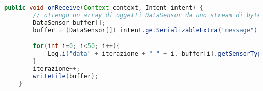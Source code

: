 \begin{lstlisting}[language=Java,  basicstyle=\footnotesize]
public void onReceive(Context context, Intent intent) {
        // ottengo un array di oggetti DataSensor da uno stream di byte
        DataSensor buffer[];
        buffer = (DataSensor[]) intent.getSerializableExtra("message");

        for(int i=0; i<50; i++){
            Log.i("data" + iterazione + " " + i, buffer[i].getSensorType() + " " );
        }
        iterazione++;
        writeFile(buffer);
    }
\end{lstlisting}